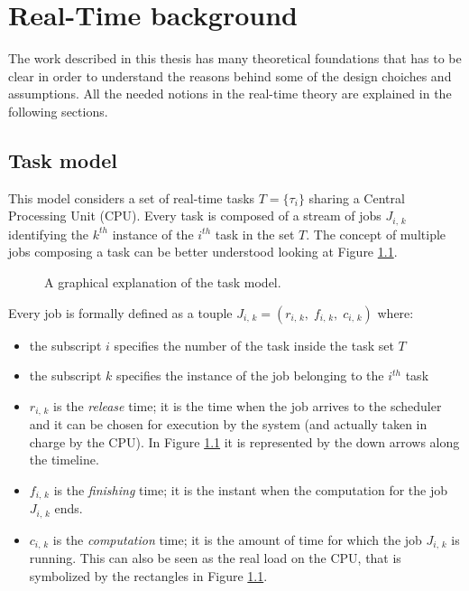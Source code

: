 \chapter{Real-Time background} \label{cha:rt_background}

The work described in this thesis has many theoretical foundations that has to be
clear in order to understand the reasons behind some of the design choiches and
assumptions. All the needed notions in the real-time theory are explained in the
following sections.


\section{Task model} \label{sec:task_model}
This model considers a set of real-time tasks \( T = \{\tau_{i}\} \)
sharing a Central Processing Unit (CPU). Every task
is composed of a stream of jobs \( J_{i,\,k} \) identifying the \( k^{th} \)
instance of the \( i^{th} \) task in the set \( T \). The concept of multiple
jobs composing a task can be better understood looking at Figure \ref{img:task_model}.
\begin{figure}[!htb]\label{img:task_model}
    \caption{A graphical explanation of the task model.}
\end{figure}

Every job is formally defined as a touple
\( J_{i,\,k} = \left(r_{i,\,k}, \;f_{i,\,k}, \;c_{i,\,k}\right) \) where:
\begin{itemize}
    \item the subscript \( i \) specifies the number of the task inside the task 
        set \( T \)
    \item the subscript \( k \) specifies the instance of the job belonging to
        the \( i^{th} \) task
    \item \( r_{i,\,k} \) is the \emph{release} time; it is the time when
        the job arrives to the scheduler and it can be chosen for execution
        by the system (and actually taken in charge by the CPU). In Figure
        \ref{img:task_model} it is represented by the down arrows along the
        timeline.
    \item \( f_{i,\,k} \) is the \emph{finishing} time; it is the instant when
        the computation for the job \( J_{i,\,k} \) ends.
    \item \( c_{i,\,k} \) is the \emph{computation} time; it is the amount of
        time for which the job \( J_{i,\,k} \) is running. This can also be seen
        as the real load on the CPU, that is symbolized by the rectangles
        in Figure \ref{img:task_model}.
\end{itemize} 


